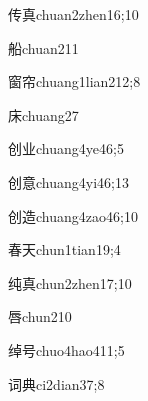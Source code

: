 \begin{verbete}{传真}{chuan2zhen1}{6;10}
\end{verbete}

\begin{verbete}{船}{chuan2}{11}
\end{verbete}

\begin{verbete}{窗帘}{chuang1lian2}{12;8}
\end{verbete}

\begin{verbete}{床}{chuang2}{7}
\end{verbete}

\begin{verbete}{创业}{chuang4ye4}{6;5}
\end{verbete}

\begin{verbete}{创意}{chuang4yi4}{6;13}
\end{verbete}

\begin{verbete}{创造}{chuang4zao4}{6;10}
\end{verbete}

\begin{verbete}{春天}{chun1tian1}{9;4}
\end{verbete}

\begin{verbete}{纯真}{chun2zhen1}{7;10}
\end{verbete}

\begin{verbete}{唇}{chun2}{10}
\end{verbete}

\begin{verbete}{绰号}{chuo4hao4}{11;5}
\end{verbete}

\begin{verbete}{词典}{ci2dian3}{7;8}
\end{verbete}

